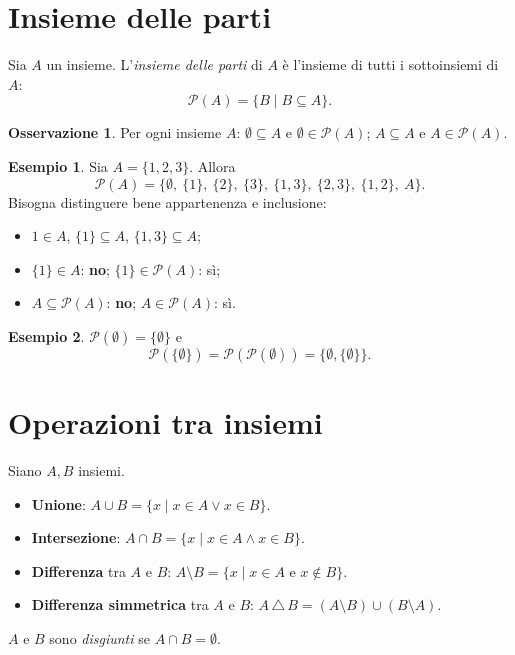 \documentclass[11pt,a4paper]{article}
\theoremstyle{definition}
\newtheorem*{esempio}{Esempio}
\newtheorem*{osservazione}{Osservazione}
\begin{document}
\section{Insieme delle parti}

\begin{definizione}
Sia $A$ un insieme. L'\emph{insieme delle parti} di $A$ è l'insieme di
tutti i sottoinsiemi di $A$:
\[
\mathcal{P}(A) = \{B \mid B \subseteq A\}.
\]
\end{definizione}

\begin{osservazione}
Per ogni insieme $A$: $\emptyset \subseteq A$ e $\emptyset \in
\mathcal{P}(A)$; $A \subseteq A$ e $A \in \mathcal{P}(A)$.
\end{osservazione}

\begin{esempio}
Sia $A = \{1, 2, 3\}$. Allora
\[
\mathcal{P}(A) = \big\{\emptyset,\ \{1\},\ \{2\},\ \{3\},\
\{1,3\},\ \{2,3\},\ \{1,2\},\ A\big\}.
\]
Bisogna distinguere bene appartenenza e inclusione:
\begin{itemize}
    \item $1 \in A$, \quad $\{1\} \subseteq A$, \quad
          $\{1, 3\} \subseteq A$;
    \item $\{1\} \in A$: \textbf{no}; \quad $\{1\} \in \mathcal{P}(A)$:
          sì;
    \item $A \subseteq \mathcal{P}(A)$: \textbf{no}; \quad
          $A \in \mathcal{P}(A)$: sì.
\end{itemize}
\end{esempio}

\begin{esempio}
$\mathcal{P}(\emptyset) = \{\emptyset\}$ e
\[
\mathcal{P}(\{\emptyset\}) = \mathcal{P}(\mathcal{P}(\emptyset))
= \{\emptyset, \{\emptyset\}\}.
\]
\end{esempio}

\section{Operazioni tra insiemi}

Siano $A, B$ insiemi.

\begin{definizione}
\begin{itemize}
    \item \textbf{Unione}: $A \cup B = \{x \mid x \in A \lor x \in B\}$.
    \item \textbf{Intersezione}: $A \cap B = \{x \mid x \in A \land
          x \in B\}$.
    \item \textbf{Differenza} tra $A$ e $B$:
          $A \setminus B = \{x \mid x \in A \text{ e } x \notin B\}$.
    \item \textbf{Differenza simmetrica} tra $A$ e $B$:
          $A \,\triangle\, B = (A \setminus B) \cup (B \setminus A)$.
\end{itemize}
$A$ e $B$ sono \emph{disgiunti} se $A \cap B = \emptyset$.
\end{definizione}
\end{document}
